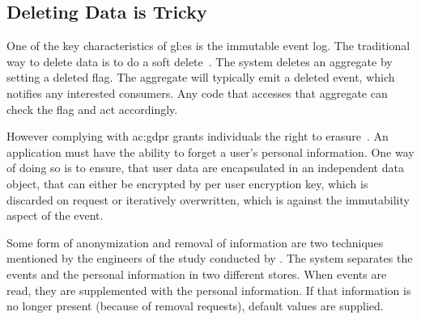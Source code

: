 
\subsection{Deleting Data is Tricky}

One of the key characteristics of \gls{gl:es} is the immutable event log. The traditional way to delete data is to do a soft delete~\citep{richardson2018microservices}. The system deletes an aggregate by setting a deleted flag. The aggregate will typically emit a deleted event, which notifies any interested consumers. Any code that accesses that aggregate can check the flag and act accordingly.

However complying with \gls{ac:gdpr} grants individuals the right to erasure~\citep{Art17GDP3}. An application must have the ability to forget a user’s personal information. One way of doing so is to ensure, that user data are encapsulated in an independent data object, that can either be encrypted by per user encryption key, which is discarded on request or iteratively overwritten, which is against the immutability aspect of the event.

Some form of anonymization and removal of information are two techniques mentioned by the engineers of the study conducted by \citep{OVEREEM2021110970}. The system separates the events and the personal information in two different stores. When events are read, they are supplemented with the personal information. If that information is no longer present (because of removal requests), default values are supplied.

